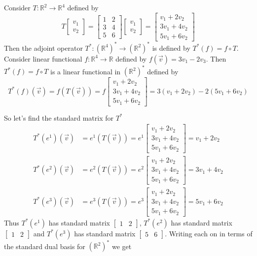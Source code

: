\begin{example} Consider $T:\mathbb{R}^2 \to \mathbb{R}^4$ defined by 
\[
T\begin{bmatrix}v_1 \\ v_2 \end{bmatrix}=
\begin{bmatrix}
1 & 2 \\
3 & 4 \\
5 & 6 
\end{bmatrix}
\begin{bmatrix}v_1 \\ v_2 \end{bmatrix}
=\begin{bmatrix}
v_1+2v_2 \\
3v_1+4v_2\\
5v_1+6v_2
\end{bmatrix}
\]
Then the adjoint operator $T^*:(\mathbb{R}^4)^* \to (\mathbb{R}^2)^*$ is defined by $T^*(f)=f \circ T$. Consider linear functional 
$f:\mathbb{R}^4 \to \mathbb{R}$ defined by $f(\vec{v})=3v_1-2v_3$. Then $T^*(f)=f \circ T$ is a linear functional in $(\mathbb{R}^2)^*$
defined by
\[
T^*(f)(\vec{v})=f(T(\vec{v}))=f
\begin{bmatrix}
v_1+2v_2 \\
3v_1+4v_2\\
5v_1+6v_2
\end{bmatrix}
=3(v_1+2v_2)-2(5v_1+6v_2)
\]

So let's find the standard matrix for $T^*$
\begin{align*}
T^*(e^1)(\vec{v}) &=e^1(T(\vec{v}))=e^1 \begin{bmatrix}
v_1+2v_2 \\
3v_1+4v_2\\
5v_1+6v_2
\end{bmatrix}=v_1+2v_2 \\
T^*(e^2)(\vec{v}) &=e^2(T(\vec{v}))=e^2 \begin{bmatrix}
v_1+2v_2 \\
3v_1+4v_2\\
5v_1+6v_2
\end{bmatrix}=3v_1+4v_2\\
%
T^*(e^3)(\vec{v}) &=e^3(T(\vec{v}))=e^3 \begin{bmatrix}
v_1+2v_2 \\
3v_1+4v_2\\
5v_1+6v_2
\end{bmatrix}=5v_1+6v_2
\end{align*}
Thus $T^*(e^1)$ has standard matrix $\begin{bmatrix}1 & 2 \end{bmatrix}$, $T^*(e^2)$ has standard matrix $\begin{bmatrix}1 & 2 \end{bmatrix}$ and 
$T^*(e^3)$ has standard matrix $\begin{bmatrix}5 & 6 \end{bmatrix}$. Writing each on in terms of the standard dual basis for $(\mathbb{R}^2)^*$ we get


\end{example}
